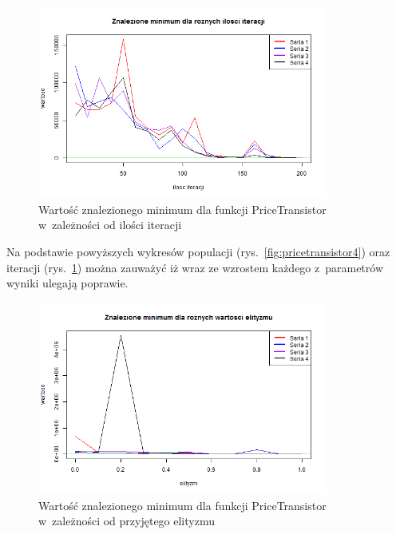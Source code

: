 \documentclass[11pt, a4paper]{article}
\newcommand{\fbi}{\leavevmode{\parindent=1em\indent}}
\begin{document}
\begin{figure}[H]
	\begin{center}
		\includegraphics[width=0.85\textwidth]{./assets/PriceTransistor5.png}
		\caption{Wartość znalezionego minimum dla funkcji PriceTransistor w~zależności od ilości iteracji}
		\label{fig:pricetransistor5}
	\end{center}
\end{figure}

\fbi
Na podstawie powyższych wykresów populacji (rys.~\ref{fig:pricetransistor4}) oraz iteracji (rys.~\ref{fig:pricetransistor5}) można zauważyć iż wraz ze wzrostem każdego z~parametrów wyniki ulegają poprawie.

\begin{figure}[H]
	\begin{center}
		\includegraphics[width=0.85\textwidth]{./assets/PriceTransistor6.png}
		\caption{Wartość znalezionego minimum dla funkcji PriceTransistor w~zależności od przyjętego elityzmu}
		\label{fig:pricetransistor6}
	\end{center}
\end{figure}
\end{document}
